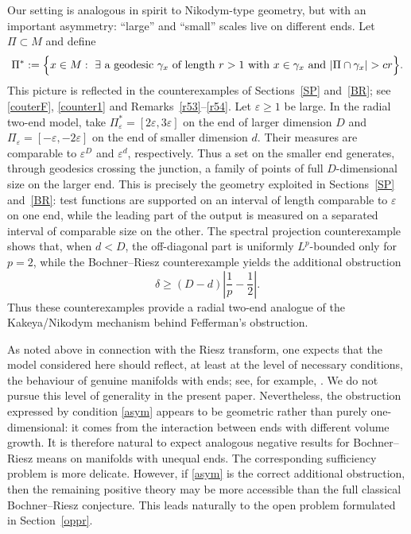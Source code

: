 \documentclass[12pt]{amsart}
\begin{document}
Our setting is analogous in spirit to Nikodym-type geometry, but with an important
asymmetry: ``large'' and ``small'' scales live on different ends. Let $\Pi\subset M$
and define
\[
  \Pi^*
  :=
  \Bigl\{
  x\in M:\ \exists\ \text{a geodesic }\gamma_x\text{ of length }r>1
  \text{ with }x\in\gamma_x
  \text{ and }|\Pi\cap\gamma_x|>cr
  \Bigr\}.
\]
This picture is reflected in the counterexamples of Sections~\ref{SP} and~\ref{BR};
see \eqref{couterF}, \eqref{counter1} and Remarks~\ref{r53}--\ref{r54}. Let
$\varepsilon\geq1$ be large. In the radial two-end model, take
$\Pi^*_\varepsilon=[2\varepsilon,3\varepsilon]$ on the end of larger dimension $D$
and $\Pi_\varepsilon=[-\varepsilon,-2\varepsilon]$ on the end of smaller dimension
$d$. Their measures are comparable to $\varepsilon^D$ and $\varepsilon^d$,
respectively. Thus a set on the smaller end generates, through geodesics crossing
the junction, a family of points of full $D$-dimensional size on the larger end.
This is precisely the geometry exploited in Sections~\ref{SP} and~\ref{BR}: test
functions are supported on an interval of length comparable to $\varepsilon$ on
one end, while the leading part of the output is measured on a separated interval
of comparable size on the other. The spectral projection counterexample shows that,
when $d<D$, the off-diagonal part is uniformly $L^p$-bounded only for $p=2$, while
the Bochner--Riesz counterexample yields the additional obstruction
\[
  \delta \geq (D-d)\left|\frac1p-\frac12\right|.
\]
Thus these counterexamples provide a radial two-end analogue of the
Kakeya/Nikodym mechanism behind Fefferman's obstruction.














As noted above in connection with the Riesz transform, one expects that the model considered here should reflect, at least at the level of necessary conditions, the behaviour of genuine manifolds with ends; see, for example, \cite{GS,HS,HNS}. We do not pursue this level of generality in the present paper. Nevertheless, the obstruction expressed by condition \eqref{asym} appears to be geometric rather than purely one-dimensional: it comes from the interaction between ends with different volume growth. It is therefore natural to expect analogous negative results for Bochner--Riesz means on manifolds with unequal ends. The corresponding sufficiency problem is more delicate. However, if \eqref{asym} is the correct additional obstruction, then the remaining positive theory may be more accessible than the full classical Bochner--Riesz conjecture. This leads naturally to the open problem formulated in Section~\ref{oppr}.
\end{document}
